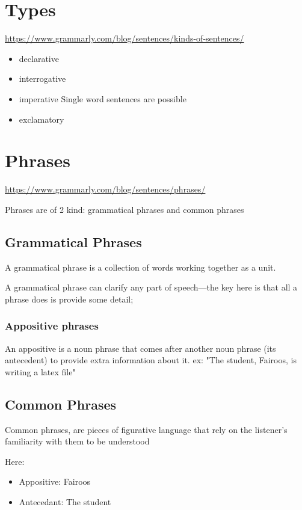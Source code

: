\documentclass{book}
\begin{document}
\chapter{Types}

\url{https://www.grammarly.com/blog/sentences/kinds-of-sentences/}

\begin{itemize}
	\item declarative
	\item interrogative
	\item imperative
	      Single word sentences are possible
	\item exclamatory
\end{itemize}

\chapter{Phrases}
\url{https://www.grammarly.com/blog/sentences/phrases/}

Phrases are of 2 kind: grammatical phrases and common phrases

\section{Grammatical Phrases}
A grammatical phrase is a collection of words working together as a unit.

A grammatical phrase can clarify any part of speech—the key here is that all a phrase does is provide some detail;

\subsection{Appositive phrases}
An appositive is a noun phrase that comes after another noun phrase (its antecedent) to provide extra information about it. ex: "The student, Fairoos, is writing a latex file"

\section{Common Phrases}
Common phrases, are pieces of figurative language that rely on the listener’s familiarity with them to be understood

Here:
\begin{itemize}
	\item Appositive: Fairoos
	\item Antecedant: The student
\end{itemize}
\end{document}
